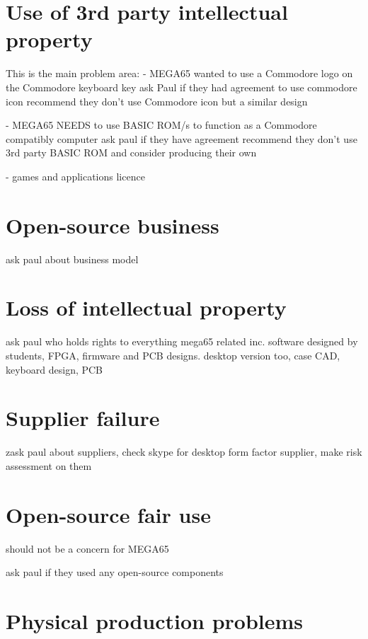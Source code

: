 \section{Use of 3rd party intellectual property}
This is the main problem area:
- MEGA65 wanted to use a Commodore logo on the Commodore keyboard key
ask Paul if they had agreement to use commodore icon
recommend they don't use Commodore icon but a similar design

- MEGA65 NEEDS to use BASIC ROM/s to function as a Commodore compatibly computer
ask paul if they have agreement
recommend they don't use 3rd party BASIC ROM and consider producing their own

- games and applications licence

\section{Open-source business}
ask paul about business model


\section{Loss of intellectual property}
ask paul who holds rights to everything mega65 related inc. software designed by students, FPGA, firmware and PCB designs. desktop version too, case CAD, keyboard design, PCB


\section{Supplier failure}
zask paul about suppliers, check skype for desktop form factor supplier, make risk assessment on them



\section{Open-source fair use}
should not be a concern for MEGA65

ask paul if they used any open-source components


\section{Physical production problems}
